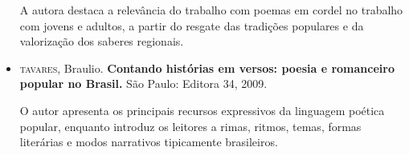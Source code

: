\documentclass[12pt]{extarticle}
\begin{document}
\begin{itemize}
A autora destaca a relevância do trabalho com poemas em cordel no
trabalho com jovens e adultos, a partir do resgate das tradições
populares e da valorização dos saberes regionais.


\item \textsc{tavares}, Braulio. \textbf{Contando histórias em versos: poesia e
romanceiro popular no Brasil.} São Paulo: Editora 34, 2009.

O autor apresenta os principais recursos expressivos da linguagem
poética popular, enquanto introduz os leitores a rimas, ritmos, temas,
formas literárias e modos narrativos tipicamente brasileiros.
\end{itemize}
\end{document}
